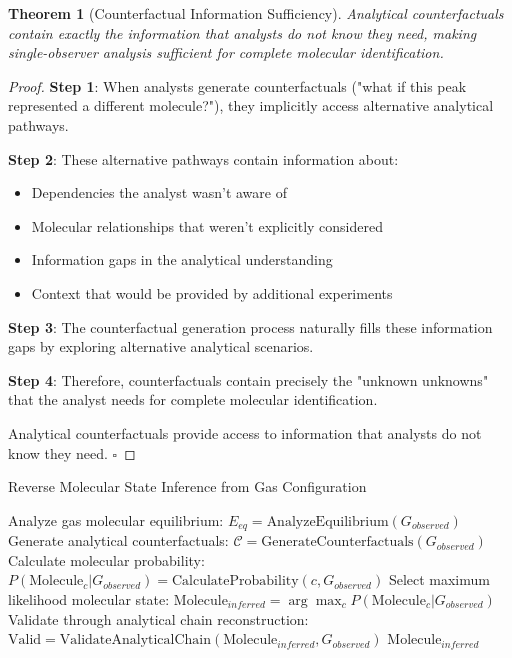 \documentclass[11pt,a4paper]{article}
\newtheorem{theorem}{Theorem}[section]
\theoremstyle{remark}
\begin{document}
\begin{theorem}[Counterfactual Information Sufficiency]
Analytical counterfactuals contain exactly the information that analysts do not know they need, making single-observer analysis sufficient for complete molecular identification.
\end{theorem}

\begin{proof}
\textbf{Step 1}: When analysts generate counterfactuals ("what if this peak represented a different molecule?"), they implicitly access alternative analytical pathways.

\textbf{Step 2}: These alternative pathways contain information about:
\begin{itemize}
\item Dependencies the analyst wasn't aware of
\item Molecular relationships that weren't explicitly considered
\item Information gaps in the analytical understanding
\item Context that would be provided by additional experiments
\end{itemize}

\textbf{Step 3}: The counterfactual generation process naturally fills these information gaps by exploring alternative analytical scenarios.

\textbf{Step 4}: Therefore, counterfactuals contain precisely the "unknown unknowns" that the analyst needs for complete molecular identification.

Analytical counterfactuals provide access to information that analysts do not know they need. $\square$
\end{proof}

\begin{algorithm}
\caption{Reverse Molecular State Inference from Gas Configuration}
\begin{algorithmic}
    \State Analyze gas molecular equilibrium: $E_{eq} = \text{AnalyzeEquilibrium}(G_{observed})$
    \State Generate analytical counterfactuals: $\mathcal{C} = \text{GenerateCounterfactuals}(G_{observed})$
        \State Calculate molecular probability: $P(\text{Molecule}_c | G_{observed}) = \text{CalculateProbability}(c, G_{observed})$
    \EndFor
    \State Select maximum likelihood molecular state: $\text{Molecule}_{inferred} = \arg\max_c P(\text{Molecule}_c | G_{observed})$
    \State Validate through analytical chain reconstruction: $\text{Valid} = \text{ValidateAnalyticalChain}(\text{Molecule}_{inferred}, G_{observed})$
    \State \Return $\text{Molecule}_{inferred}$
\EndProcedure
\end{algorithmic}
\end{algorithm}
\end{document}
